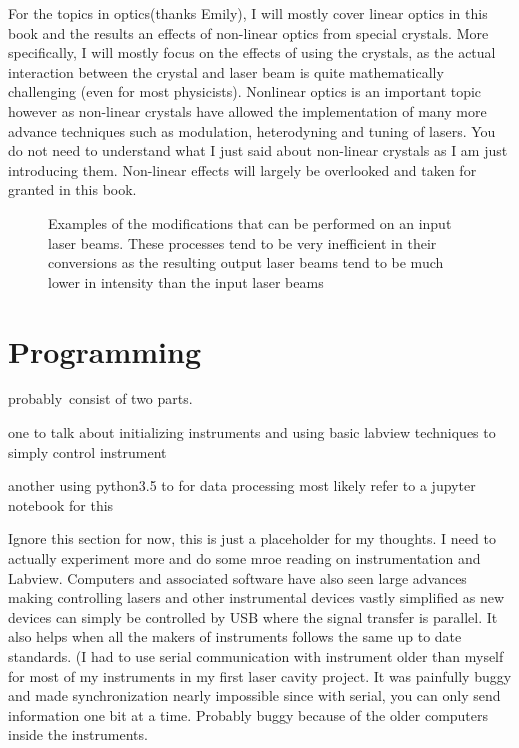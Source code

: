 \documentclass[11pt,a4paper]{book}
\newcommand{\imginput}[1]{} %
\begin{document}
		For the topics in optics(thanks Emily), 
		I will mostly cover linear optics in this book and the results an effects of non-linear optics from special crystals. More specifically, I will mostly focus on the effects of using the crystals, as the actual interaction between the crystal and laser beam is quite mathematically challenging (even for most physicists). Nonlinear optics is an important topic however as non-linear crystals have allowed the implementation of many more advance techniques such as modulation, heterodyning and tuning of lasers. You do not need to understand what I just said about non-linear crystals as I am just introducing them. Non-linear effects will largely be overlooked and taken for granted in this book. 
		
		\begin{figure} [!ht]
			\centering
			\def\svgwidth{\columnwidth}
			\resizebox{16cm}{!}{\imginput{images/non-linear-crystals.pdf_tex}}
			\caption{Examples of the modifications that can be performed on an input laser beams. These processes tend to be very inefficient in their conversions as the resulting output laser beams tend to be much lower in intensity than the input laser beams}
			\label{fig:non-linear-crystals}
		\end{figure}
		
	\section{Programming}
		\label{sec:Programming}
		probably\ consist of two parts.
		
		one to talk about initializing instruments and using basic labview techniques to simply control instrument 
		
		another using python3.5 to for data processing
		most likely refer to a jupyter notebook for this
		
		Ignore this section for now, this is just a placeholder for my thoughts. I need to actually experiment more and do some mroe reading on instrumentation and Labview. Computers and associated software have also seen large advances making controlling lasers and other instrumental devices vastly simplified as new devices can simply be controlled by USB where the signal transfer is parallel. It also helps when all the makers of instruments follows the same up to date standards. (I had to use serial communication with instrument older than myself for most of my instruments in my first laser cavity project. It was painfully buggy and made synchronization nearly impossible since with serial, you can only send information one bit at a time. Probably buggy because of the older computers inside the instruments.
\end{document}
